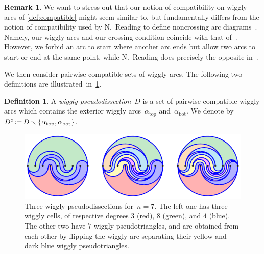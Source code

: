 \documentclass{amsart}
\theoremstyle{definition}
\newtheorem{definition}[theorem]{Definition}
\newtheorem{remark}[theorem]{Remark}
\newcommand{\ssm}{\smallsetminus} %
\newcommand{\eqdef}{\mbox{\,\raisebox{0.2ex}{\scriptsize\ensuremath{\mathrm:}}\ensuremath{=}\,}} %
\newcommand{\darkblue}{\color{darkblue}} %
\newcommand{\defn}[1]{\textsl{\darkblue #1}} %
\newcommand{\vincent}[1]{\todo[color=blue!30]{\rm #1 \\ \hfill --- V.}}
\begin{document}
\begin{remark}
We want to stress out that our notion of compatibility on wiggly arcs of \cref{def:compatible} might seem similar to, but fundamentally differs from the notion of compatibility used by N.~Reading to define noncrossing arc diagrams~\cite{Reading-arcDiagrams}.
Namely, our wiggly arcs and our crossing condition coincide with that of~\cite{Reading-arcDiagrams}.
However, we forbid an arc to start where another arc ends but allow two arcs to start or end at the same point,
while N.~Reading does precisely the opposite in~\cite{Reading-arcDiagrams}.
\end{remark}

We then consider pairwise compatible sets of wiggly arcs.
The following two definitions are illustrated~in~\cref{fig:pseudodissections}.

\begin{definition}
A \defn{wiggly pseudodissection}~$D$ is a set of pairwise compatible wiggly arcs which contains the exterior wiggly arcs~$\alpha_\mathrm{top}$ and~$\alpha_\mathrm{bot}$. We denote by~$D^\circ \eqdef D \ssm \{\alpha_\mathrm{top}, \alpha_\mathrm{bot}\}$.
%
\begin{figure}
\centerline{\includegraphics[scale=1.5]{wigglyPseudodissections}}
\caption{Three wiggly pseudodissections for~$n = 7$. The left one has three wiggly cells, of respective degrees $3$ (red), $8$ (green), and $4$ (blue). The other two have $7$ wiggly pseudotriangles, and are obtained from each other by flipping the wiggly arc separating their yellow and dark blue wiggly pseudotriangles.}
\label{fig:pseudodissections}
\end{figure}
\end{definition}

\end{document}

